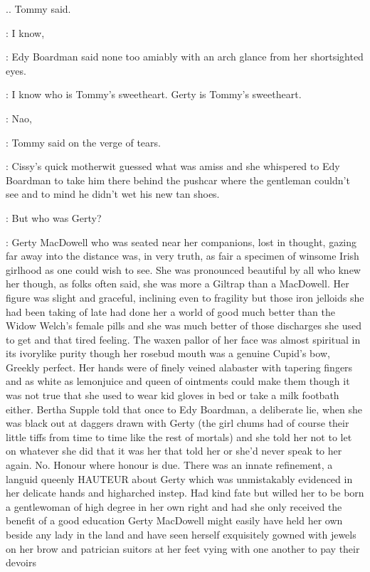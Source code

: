 .. Tommy said.

\edy:
I know,

:
Edy Boardman said none too amiably with an arch glance from
her shortsighted eyes.

\edy:
I know who is Tommy's sweetheart. Gerty is Tommy's sweetheart.

\tommy:
Nao,

:
Tommy said on the verge of tears.

:
Cissy's quick motherwit guessed what was amiss and she whispered
to Edy Boardman to take him there behind the pushcar where the
gentleman couldn't see and to mind he didn't wet his new tan shoes.

:
But who was Gerty?

:
Gerty MacDowell who was seated near her companions, lost in
thought, gazing far away into the distance was, in very truth, as fair a
specimen of winsome Irish girlhood as one could wish to see. She was
pronounced beautiful by all who knew her though, as folks often said, she
was more a Giltrap than a MacDowell. Her figure was slight and graceful,
inclining even to fragility but those iron jelloids she had been taking of
late had done her a world of good much better than the Widow Welch's
female pills and she was much better of those discharges she used to get
and that tired feeling. The waxen pallor of her face was almost spiritual
in its ivorylike purity though her rosebud mouth was a genuine Cupid's
bow, Greekly perfect. Her hands were of finely veined alabaster
with tapering fingers and as white as lemonjuice and queen of ointments
could make them though it was not true that she used to wear kid gloves
in bed or take a milk footbath either. Bertha Supple told that once
to Edy Boardman, a deliberate lie, when she was black out at daggers
drawn with Gerty (the girl chums had of course their little tiffs
from time to time like the rest of mortals) and she told her not to
let on whatever she did that it was her that told her or she'd never
speak to her again. No. Honour where honour is due. There was an
innate refinement, a languid queenly HAUTEUR about Gerty which
was unmistakably evidenced in her delicate hands and higharched instep.
Had kind fate but willed her to be born a gentlewoman of high degree in
her own right and had she only received the benefit of a good education
Gerty MacDowell might easily have held her own beside any lady in the
land and have seen herself exquisitely gowned with jewels on her brow and
patrician suitors at her feet vying with one another to pay their devoirs

